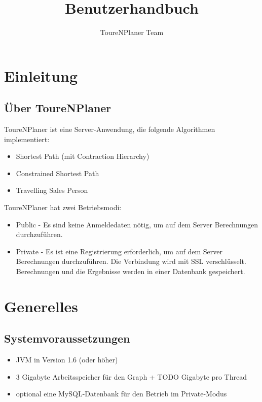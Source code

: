 \documentclass[ngerman,titlepage,parskip=true]{scrartcl}
\title{Benutzerhandbuch}
\author{ToureNPlaner Team}
\begin{document}
\maketitle

\tableofcontents

\pagebreak

\section{Einleitung}

	\subsection{\"Uber ToureNPlaner}
   ToureNPlaner ist eine Server-Anwendung, die folgende Algorithmen implementiert:
   \begin{itemize}
     \item Shortest Path (mit Contraction Hierarchy)
     \item Constrained Shortest Path
     \item Travelling Sales Person
   \end{itemize}
   ToureNPlaner hat zwei Betriebsmodi:
   \begin{itemize}
     \item Public - Es sind keine Anmeldedaten n\"otig, um auf dem Server Berechnungen durchzuf\"uhren.
     \item Private - Es ist eine Registrierung erforderlich, um auf dem Server Berechnungen durchzuf\"uhren. Die Verbindung wird mit SSL verschl\"usselt. Berechnungen und die Ergebnisse werden in einer Datenbank gespeichert.
   \end{itemize}


\section{Generelles}
	\subsection{Systemvoraussetzungen}
	
	\begin{itemize}
		\item JVM in Version 1.6 (oder h\"oher)
		\item 3 Gigabyte Arbeitsspeicher f\"ur den Graph + TODO Gigabyte pro Thread
		\item optional eine MySQL-Datenbank f\"ur den Betrieb im Private-Modus
	\end{itemize}
\end{document}
